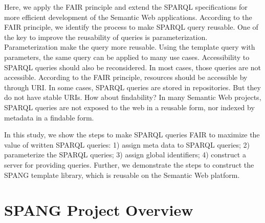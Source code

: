 \documentclass[runningheads]{llncs}
\begin{document}

Here, we apply the FAIR principle and extend the SPARQL specifications for more efficient development of the Semantic Web applications.
According to the FAIR principle, we identify the process to make SPARQL query reusable.
One of the key to improve the reusability of queries is parameterization.
Parameterization make the query more reusable.
Using the template query with parameters, the same query can be applied to many use cases.
Accessibility to SPARQL queries should also be reconsidered.
In most cases, those queries are not accessible. According to the FAIR principle, resources should be accessible by through URI. In some cases, SPARQL queries are stored in repositories. But they do not have stable URIs. How about findability? 
In many Semantic Web projects, 
SPARQL queries are not exposed to the web in a reusable form, nor indexed by metadata in a findable form.

In this study, we show the steps to make SPARQL queries FAIR to maximize the value of written SPARQL queries:
1) assign meta data to SPARQL queries;
2) parameterize the SPARQL queries;
3) assign global identifiers;
4) construct a server for providing queries.
Further, we demonstrate the steps to construct the SPANG template library, which is reusable on the Semantic Web platform.


\section{SPANG Project Overview}
\end{document}
